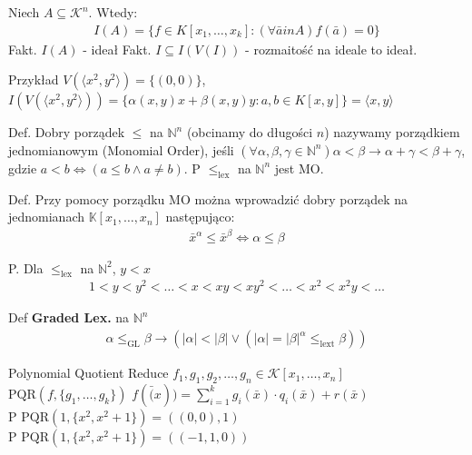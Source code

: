 \documentclass{article}
\numberwithin{equation}{subsection}
\newenvironment{definition}[1]{%
    \trivlist
    \item[\hskip\labelsep\textbf{Definition. #1.}]
    \ignorespaces
}{%
    \endtrivlist
}
\begin{document}
\begin{definition}{Ideał Generowany}
    Niech $A\subseteq \mathcal{K}^n$. Wtedy:
    \begin{align*}
        I(A) = \{f \in K[x_1,\dots,x_k] : \left(\forall \bar{a} in A\right) f(\bar{a}) = 0\}
    \end{align*}
    Fakt. $I(A)$ - ideał
    Fakt. $I\subseteq I(V(I))$ - rozmaitość na ideale to ideał.
\end{definition}

Przykład $V(\langle x^2, y^2 \rangle) = \{(0,0)\}$, $I(V(\langle x^2, y^2 \rangle)) = \{\alpha(x,y) x + \beta(x,y) y : a,b \in K[x,y]\} = \langle x,y \rangle$

Def. Dobry porządek $\leq$ na $\mathbb{N}^n$ (obcinamy do długości $n$) nazywamy porządkiem jednomianowym (Monomial Order), jeśli 
$\left(\forall \alpha, \beta, \gamma \in \mathbb{N}^n\right) \alpha < \beta \to \alpha + \gamma < \beta + \gamma$,
gdzie $a < b \iff (a\leq b \land a \neq b)$. P $\leq_\text{lex}$ na $\mathbb{N}^n$ jest MO.

Def. Przy pomocy porządku MO można wprowadzić dobry porządek na jednomianach $\mathbb{K}[x_1,\dots,x_n]$ następująco:
\begin{align*}
    \bar{x}^\alpha \leq \bar{x}^\beta \iff \alpha \leq \beta
\end{align*}

P. Dla $\leq_{\text{lex}}$ na $\mathbb{N}^2$, $y<x$
\begin{align*}
    1 < y < y^2 < \dots < x < xy < xy^2 < \dots < x^2 < x^2y < \dots
\end{align*}

Def \textbf{Graded Lex.} na $\mathbb{N}^n$
\begin{align*}
    \alpha \leq_{\text{GL}} \beta \to (|\alpha| < |\beta| \lor (|\alpha|=|\beta| ^ \alpha \leq_{\text{lext}} \beta))
\end{align*}

Polynomial Quotient Reduce $f_1,g_1,g_2,\dots,g_n \in \mathcal{K}[x_1,\dots,x_n]$\\
$\text{PQR}(f,\{g_1,\dots,g_k\})$ $f(\bar(x))=\sum_{i=1}^{k} g_i(\bar{x}) \cdot q_i(\bar{x}) + r(\bar{x})$\\
P $\text{PQR}(1,\{x^2,x^2+1\}) = ((0,0),1)$\\
P $\text{PQR}(1,\{x^2,x^2+1\}) = ((-1,1,0))$\\
\end{document}
